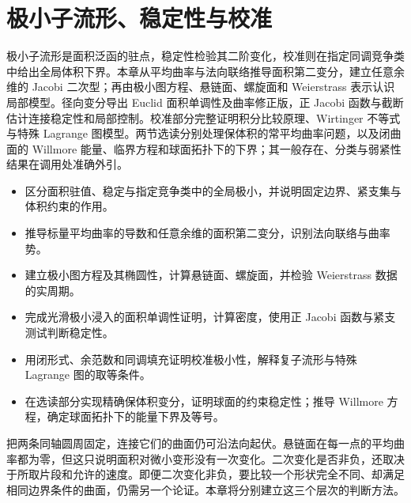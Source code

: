 
% 
% 

\chapter{极小子流形、稳定性与校准}
\label{g3:ch:19}

\begin{chapterabstract}
	极小子流形是面积泛函的驻点，稳定性检验其二阶变化，校准则在指定同调竞争类中给出全局体积下界。本章从平均曲率与法向联络推导面积第二变分，建立任意余维的 Jacobi 二次型；再由极小图方程、悬链面、螺旋面和 Weierstrass 表示认识局部模型。径向变分导出 Euclid 面积单调性及曲率修正版，正 Jacobi 函数与截断估计连接稳定性和局部控制。校准部分完整证明积分比较原理、Wirtinger 不等式与特殊 Lagrange 图模型。两节选读分别处理保体积的常平均曲率问题，以及闭曲面的 Willmore 能量、临界方程和球面拓扑下的下界；其一般存在、分类与弱紧性结果在调用处准确外引。
\end{chapterabstract}

\begin{learninggoals}
	\begin{itemize}
		\item 区分面积驻值、稳定与指定竞争类中的全局极小，并说明固定边界、紧支集与体积约束的作用。
		\item 推导标量平均曲率的导数和任意余维的面积第二变分，识别法向联络与曲率势。
		\item 建立极小图方程及其椭圆性，计算悬链面、螺旋面，并检验 Weierstrass 数据的实周期。
		\item 完成光滑极小浸入的面积单调性证明，计算密度，使用正 Jacobi 函数与紧支测试判断稳定性。
		\item 用闭形式、余范数和同调填充证明校准极小性，解释复子流形与特殊 Lagrange 图的取等条件。
		\item 在选读部分实现精确保体积变分，证明球面的约束稳定性；推导 Willmore 方程，确定球面拓扑下的能量下界及等号。
	\end{itemize}
\end{learninggoals}

把两条同轴圆周固定，连接它们的曲面仍可沿法向起伏。悬链面在每一点的平均曲率都为零，但这只说明面积对微小变形没有一次变化。二次变化是否非负，还取决于所取片段和允许的速度。即便二次变化非负，要比较一个形状完全不同、却满足相同边界条件的曲面，仍需另一个论证。本章将分别建立这三个层次的判断方法。

